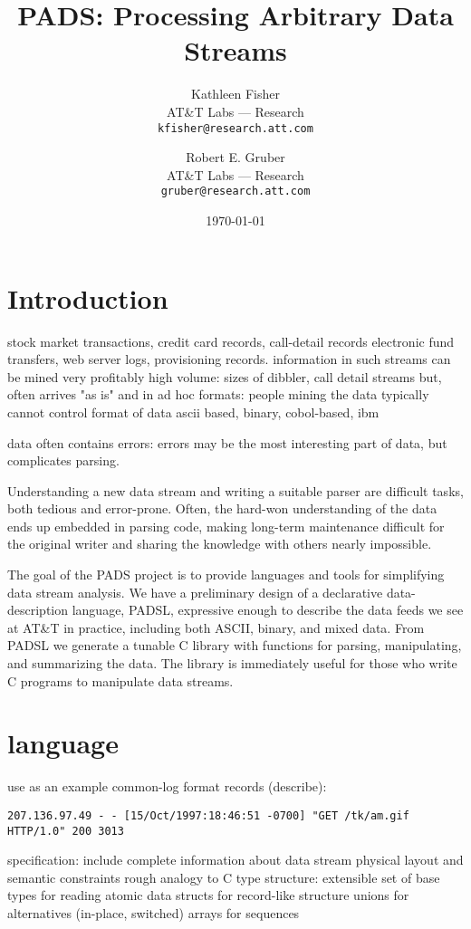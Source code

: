\documentclass[10pt]{article}
\title{PADS: Processing Arbitrary Data Streams}
\date{\today}
\author{
  Kathleen Fisher\\
  AT\&T Labs --- Research \\
  \small\texttt{kfisher@research.att.com}
\and
  Robert E. Gruber \\
  AT\&T Labs --- Research \\
  \small\texttt{gruber@research.att.com}
}
\begin{document}
\maketitle
\thispagestyle{empty}

\section{Introduction}
  stock market transactions, credit card records, call-detail records
  electronic fund transfers, web server logs, provisioning records.
information in such streams can be mined very profitably 
\cite{kdd98,kdd99,kdd00}
high volume: sizes of dibbler, call detail streams
but, often arrives "as is" and in ad hoc formats:
  people mining the data typically cannot control format of data
  ascii based, binary, cobol-based, ibm

data often contains errors:
 errors may be the most interesting part of data, 
 but complicates parsing.

Understanding a new data stream and writing a suitable
parser are difficult tasks, both tedious and error-prone.
Often, the hard-won understanding of the data ends
up embedded in parsing code, making long-term maintenance difficult
for the original writer and sharing the knowledge with others 
nearly impossible.

The goal of the PADS project is to provide languages and tools for
simplifying data stream analysis.  We have a preliminary design of a
declarative data-description language, PADSL, expressive enough to
describe the data feeds we see at AT\&T in practice, including both ASCII,
binary, and mixed data.  From PADSL we generate a tunable C library with
functions for parsing, manipulating, and summarizing the data.  The
library is immediately useful for those who write C programs to
manipulate data streams.  

\section{\pads{} language}
use as an example common-log format records (describe):
\begin{verbatim}
207.136.97.49 - - [15/Oct/1997:18:46:51 -0700] "GET /tk/am.gif HTTP/1.0" 200 3013
\end{verbatim}

specification:
 include complete information about data stream
 physical layout and semantic constraints
 rough analogy to C type structure:
   extensible set of base types for reading atomic data
   structs for record-like structure
   unions for alternatives (in-place, switched)
   arrays for sequences
\end{document}
